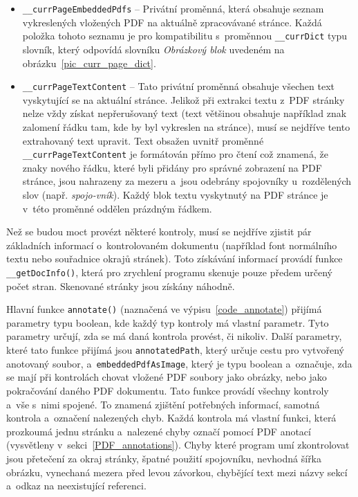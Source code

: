 \begin{itemize}
    \item \texttt{\_\_currPageEmbeddedPdfs} -- Privátní proměnná, která obsahuje
    seznam vykreslených vložených PDF na aktuálně zpracovávané stránce. Každá
    položka tohoto seznamu je pro kompatibilitu s~proměnnou \texttt{\_\_currDict}
    typu slovník, který odpovídá slovníku \emph{Obrázkový blok} uvedeném na
    obrázku~\ref{pic_curr_page_dict}. 
    
    \item \texttt{\_\_currPageTextContent} -- Tato privátní proměnná obsahuje
    všechen text vyskytující se na aktuální stránce. Jelikož při extrakci textu
    z~PDF stránky nelze vždy získat nepřerušovaný text (text většinou obsahuje
    například znak zalomení řádku tam, kde by byl vykreslen na stránce), 
    musí se nejdříve tento extrahovaný text upravit.
    Text obsažen uvnitř proměnné \texttt{\_\_currPageTextContent} je formátován
    přímo pro čtení což znamená, že znaky nového řádku, které byli přidány pro správné 
    zobrazení na PDF stránce, jsou nahrazeny za mezeru a~jsou odebrány
    spojovníky u~rozdělených slov (např. \emph{spojo-vník}). Každý blok textu
    vyskytnutý na PDF stránce je v~této proměnné
    oddělen prázdným řádkem. 
\end{itemize}

Než se budou moct provézt některé kontroly, musí se nejdříve zjistit pár
základních informací o~kontrolovaném dokumentu (například font normálního textu
nebo souřadnice okrajů stránek). Toto získávání informací provádí funkce
\texttt{\_\_getDocInfo()}, která pro zrychlení programu skenuje pouze předem
určený počet stran. Skenované stránky jsou získány náhodně.

Hlavní funkce \texttt{annotate()} (naznačená ve výpisu~\ref{code_annotate}) přijímá parametry typu boolean, kde
každý typ kontroly má vlastní parametr. Tyto parametry určují, zda se má daná
kontrola provést, či nikoliv. Další parametry, které tato funkce přijímá jsou
\texttt{annotatedPath}, který určuje cestu pro vytvořený anotovaný soubor,
a~\texttt{embeddedPdfAsImage}, který je typu boolean a~označuje, zda se mají
při kontrolách chovat vložené PDF soubory jako obrázky, nebo jako pokračování
daného PDF dokumentu. Tato funkce provádí všechny kontroly a~vše s~nimi spojené.
To znamená zjištění potřebných informací, samotná kontrola a~označení nalezených
chyb. Každá kontrola má vlastní funkci, která prozkoumá jednu stránku a~nalezené
chyby označí pomocí PDF anotací (vysvětleny v~sekci~\ref{PDF_annotations}).
Chyby které program umí zkontrolovat jsou přetečení za okraj stránky, 
špatné použití spojovníku, nevhodná šířka obrázku, vynechaná mezera před levou
závorkou, chybějící text mezi názvy sekcí a~odkaz na neexistující referenci.

